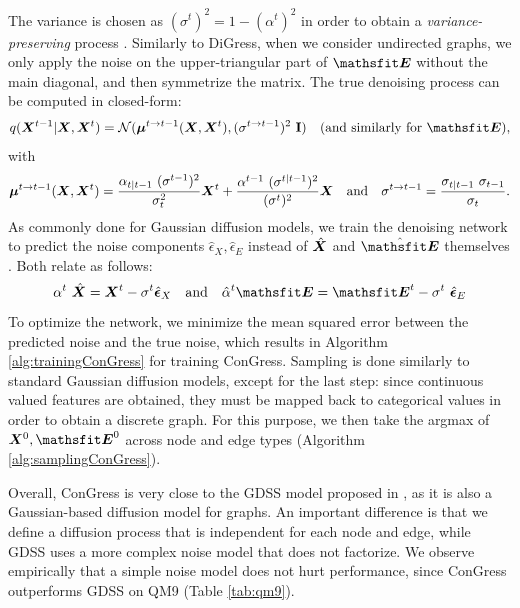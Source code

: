\documentclass{article} %
\theoremstyle{plain}
\theoremstyle{definition}
\theoremstyle{remark}
\begin{document}
The variance is chosen as $(\sigma^t)^2 = 1 - (\alpha^t)^2$ in order to obtain a \emph{variance-preserving} process \citep{kingma2021variational}.
Similarly to DiGress, when we consider undirected graphs, we only apply the noise on the  upper-triangular part of $\tE$ without the main diagonal, and then symmetrize the matrix. The true denoising process can be computed in closed-form:
\begin{equation}
    q(\mX^{t-1} | \mX, \mX^{t}) = \mathcal{N}(\vmu^{t \rightarrow t-1}(\mX, \mX^{t}), (\sigma^{t \rightarrow t-1})^2 ~\rmI) \quad \text{(and similarly for } \tE), 
    \label{eq:background_noise_posterior}
\end{equation}
with
\begin{equation}
{\bm{\mu}}^{t \rightarrow t-1}({\bm{X}}, {\bm{X}}^{t}) = \frac{\alpha_{t|t-1}~ (\sigma^{t-1})^2}{\sigma_{t}^2} {\bm{X}}^{t} + \frac{\alpha^{t-1}~ (\sigma^{t|t-1})^2}{(\sigma^{t})^2} {\bm{X}} \quad\text{and}\quad \sigma^{t \rightarrow t-1} = \frac{\sigma_{t|t-1} ~\sigma_{t-1}}{\sigma_{t}}.
\end{equation}
As commonly done for Gaussian diffusion models, we train the denoising network to predict the noise components $\hat{\epsilon}_X, \hat{\epsilon}_E$ instead of $\hat{{\bm{X}}}$ and $\hat{\tE}$ themselves \citep{ho2020denoising}. 
Both relate as follows:
\begin{equation}
\alpha^t ~\hat \mX = \mX^t - \sigma^t \hat{\bm\epsilon}_X   \quad \text{and} \quad \hat \alpha^t \tE = \tE^t - \sigma^t ~\hat{\bm\epsilon}_E 
\end{equation}
To optimize the network, we minimize the mean squared error between the predicted noise and the true noise, which results in Algorithm \ref{alg:trainingConGress} for training ConGress.
Sampling is done similarly to standard Gaussian diffusion models, except for the last step: since continuous valued features are obtained, they must be mapped back to categorical values in order to obtain a discrete graph. For this purpose, we then take the argmax of $\mX^0, \tE^0$ across node and edge types (Algorithm \ref{alg:samplingConGress}).

Overall, ConGress is very close to the GDSS model proposed in \citet{jo2022score}, as it is also a Gaussian-based diffusion model for graphs. An important difference is that we define a diffusion process that is independent for each node and edge, while GDSS uses a more complex noise model that does not factorize. We observe empirically that a simple noise model does not hurt performance, since ConGress outperforms GDSS on QM9 (Table \ref{tab:qm9}).
\end{document}
